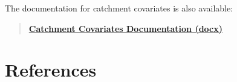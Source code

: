 \documentclass[
]{book}
\begin{document}
The documentation for catchment covariates is also available:

\begin{quote}
\textbf{\href{https://ecosheds.s3.amazonaws.com/necd/docs/NHDHRDV2_Covariate_Documentation.xlsx}{Catchment Covariates Documentation (docx)}}
\end{quote}

\chapter*{References}\label{references}

  
\end{document}
